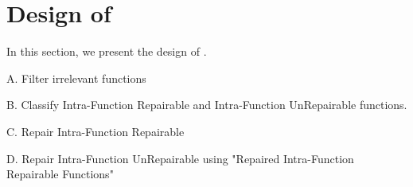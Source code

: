 
\section{Design of \tool}\label{sec:approach}


In this section, we present the design of \tool.


A. Filter irrelevant functions

B. Classify Intra-Function Repairable and Intra-Function UnRepairable functions.

C. Repair Intra-Function Repairable

D. Repair Intra-Function UnRepairable using "Repaired Intra-Function Repairable Functions"


